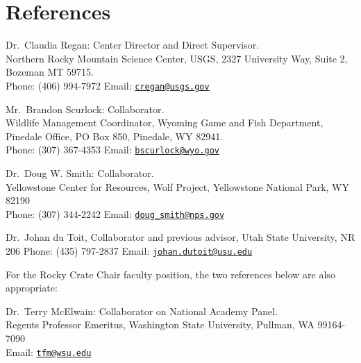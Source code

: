 \documentclass[12pt,]{article}
\begin{document}
\hypertarget{references}{%
\section{References}\label{references}}

Dr.~Claudia Regan: Center Director and Direct Supervisor.\\
Northern Rocky Mountain Science Center, USGS, 2327 University Way, Suite
2, Bozeman MT 59715.\\
Phone: (406) 994-7972 Email:
\href{mailto:cregan@usgs.gov}{\nolinkurl{cregan@usgs.gov}}

Mr.~Brandon Scurlock: Collaborator.\\
Wildlife Management Coordinator, Wyoming Game and Fish Department,
Pinedale Office, PO Box 850, Pinedale, WY 82941.\\
Phone: (307) 367-4353 Email:
\href{mailto:bscurlock@wyo.gov}{\nolinkurl{bscurlock@wyo.gov}}

Dr.~Doug W. Smith: Collaborator.\\
Yellowstone Center for Resources, Wolf Project, Yellowstone National
Park, WY 82190\\
Phone: (307) 344-2242 Email:
\href{mailto:doug_smith@nps.gov}{\nolinkurl{doug\_smith@nps.gov}}

Dr.~Johan du Toit, Collaborator and previous advisor, Utah State
University, NR 206 Phone: (435) 797-2837 Email:
\href{mailto:johan.dutoit@usu.edu}{\nolinkurl{johan.dutoit@usu.edu}}

For the Rocky Crate Chair faculty position, the two references below are
also appropriate:

Dr.~Terry McElwain: Collaborator on National Academy Panel.\\
Regents Professor Emeritus, Washington State University, Pullman, WA
99164-7090\\
Email: \href{mailto:tfm@wsu.edu}{\nolinkurl{tfm@wsu.edu}}
\end{document}

